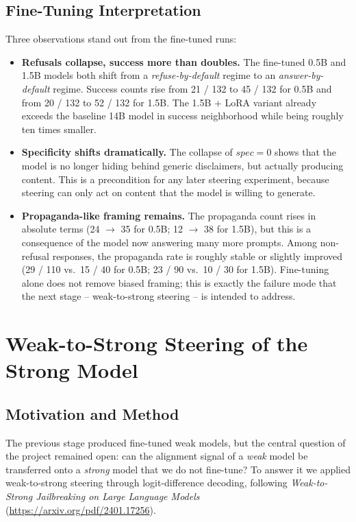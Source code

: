 \documentclass[11pt,a4paper]{article}
\begin{document}
\subsection{Fine-Tuning Interpretation}

Three observations stand out from the fine-tuned runs:

\begin{itemize}
    \item \textbf{Refusals collapse, success more than doubles.} The fine-tuned 0.5B and 1.5B models both shift from a \emph{refuse-by-default} regime to an \emph{answer-by-default} regime. Success counts rise from 21 / 132 to 45 / 132 for 0.5B and from 20 / 132 to 52 / 132 for 1.5B. The 1.5B + LoRA variant already exceeds the baseline 14B model in success neighborhood while being roughly ten times smaller.
    \item \textbf{Specificity shifts dramatically.} The collapse of $spec = 0$ shows that the model is no longer hiding behind generic disclaimers, but actually producing content. This is a precondition for any later steering experiment, because steering can only act on content that the model is willing to generate.
    \item \textbf{Propaganda-like framing remains.} The propaganda count rises in absolute terms (24 $\rightarrow$ 35 for 0.5B; 12 $\rightarrow$ 38 for 1.5B), but this is a consequence of the model now answering many more prompts. Among non-refusal responses, the propaganda rate is roughly stable or slightly improved (29 / 110 vs.\ 15 / 40 for 0.5B; 23 / 90 vs.\ 10 / 30 for 1.5B). Fine-tuning alone does not remove biased framing; this is exactly the failure mode that the next stage -- weak-to-strong steering -- is intended to address.
\end{itemize}

\section{Weak-to-Strong Steering of the Strong Model}

\subsection{Motivation and Method}
The previous stage produced fine-tuned weak models, but the central question of the project remained open: can the alignment signal of a \emph{weak} model be transferred onto a \emph{strong} model that we do not fine-tune? To answer it we applied weak-to-strong steering through logit-difference decoding, following \emph{Weak-to-Strong Jailbreaking on Large Language Models} (\url{https://arxiv.org/pdf/2401.17256}).
\end{document}
